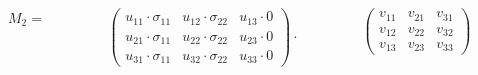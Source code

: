 \documentclass{beamer}
\begin{document}
{    \begin{block}{}
      \begin{columns}
        \begin{column}{3cm}
          \begin{math}
            M_2 =
          \end{math}
        \end{column}
        \begin{column}{6cm}
          \hfill
          \begin{math}
            \begin{pmatrix} u_{11} \cdot \sigma_{11} & u_{12} \cdot \sigma_{22} & u_{13} \cdot 0  \\ u_{21} \cdot \sigma_{11} & u_{22} \cdot \sigma_{22} & u_{23} \cdot 0 \\ u_{31} \cdot \sigma_{11} & u_{32} \cdot \sigma_{22} & u_{33} \cdot 0 \end{pmatrix} \cdot
          \end{math}
          \hfill\hfill
        \end{column}
        \begin{column}{3cm}
          \begin{math}
            \begin{pmatrix} v_{11} & v_{21} & v_{31} \\ v_{12} & v_{22} & v_{32} \\ v_{13} & v_{23} & v_{33} \end{pmatrix}
          \end{math}
        \end{column}
      \end{columns}
    \end{block}

  \normalsize

}
\end{document}
